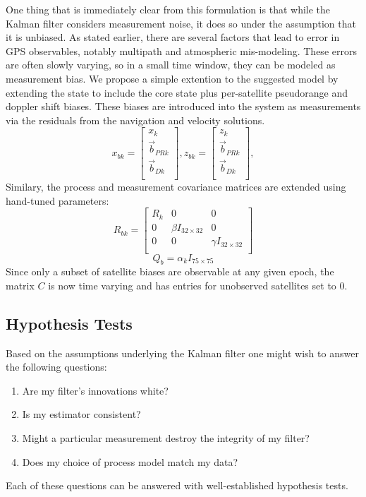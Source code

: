 One thing that is immediately clear from this formulation is that while the Kalman filter considers measurement noise, it does so under the assumption that it is unbiased.  As stated earlier, there are several factors that lead to error in GPS observables, notably multipath and atmospheric mis-modeling.  These errors are often slowly varying, so in a small time window, they can be modeled as measurement bias.  We propose a simple extention to the suggested model by extending the state to include the core state plus per-satellite pseudorange and doppler shift biases.  These biases are introduced into the system as measurements via the residuals from the navigation and velocity solutions.
\begin{equation}
x_{bk} = \left[
\begin{array}{c}
x_k\\
\vec{b}_{PRk}\\
\vec{b}_{Dk}\\
\end{array}
\right],
z_{bk} = \left[
\begin{array}{c}
z_k\\
\vec{b}_{PRk}\\
\vec{b}_{Dk}\\
\end{array}
\right],
\end{equation}
Similary, the process and measurement covariance matrices are extended using hand-tuned parameters:
\begin{equation}
R_{bk} = \left[
\begin{array}{ccc}
R_k & 0 & 0\\
0 & \beta I_{32\times32} & 0\\
0 & 0 & \gamma I_{32\times32}\\
\end{array}
\right]
\end{equation}
\[Q_b = \alpha_k I_{75\times75}\]
Since only a subset of satellite biases are observable at any given epoch, the matrix $C$ is now time varying and has entries for unobserved satellites set to $0$.

\subsection{Hypothesis Tests}
Based on the assumptions underlying the Kalman filter one might wish to answer the following questions:
\begin{enumerate}
\item Are my filter's innovations white?
\item Is my estimator consistent?
\item Might a particular measurement destroy the integrity of my filter?
\item Does my choice of process model match my data?
\end{enumerate}
Each of these questions can be answered with well-established hypothesis tests.


